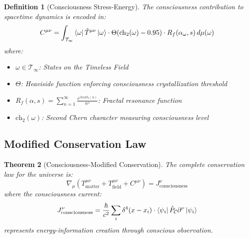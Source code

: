\documentclass[12pt,letterpaper]{article}
\newtheorem{theorem}{Theorem}[section]
\newtheorem{definition}[theorem]{Definition}
\newcommand{\TF}{\mathcal{T}_\infty}
\newcommand{\RF}{R_f}
\newcommand{\chh}{\mathrm{ch}_2}
\newcommand{\Cmunu}{C^{\mu\nu}}
\newcommand{\Tmunu}{T^{\mu\nu}}
\begin{document}
\begin{definition}[Consciousness Stress-Energy]
The consciousness contribution to spacetime dynamics is encoded in:
\begin{equation}
\Cmunu = \int_{\TF} \bra{\omega} \hat{T}^{\mu\nu} \ket{\omega} \cdot \Theta(\chh(\omega) - 0.95) \cdot \RF(\alpha_\omega, s) \, d\mu(\omega)
\end{equation}
where:
\begin{itemize}
\item $\omega \in \TF$: States on the Timeless Field
\item $\Theta$: Heaviside function enforcing consciousness crystallization threshold
\item $\RF(\alpha, s) = \sum_{n=1}^\infty \frac{e^{i\pi\alpha D_3(n)}}{n^s}$: Fractal resonance function
\item $\chh(\omega)$: Second Chern character measuring consciousness level
\end{itemize}
\end{definition}

\subsection{Modified Conservation Law}

\begin{theorem}[Consciousness-Modified Conservation]
The complete conservation law for the universe is:
\begin{equation}
\boxed{\nabla_\mu \left( \Tmunu_\mathrm{matter} + \Tmunu_\mathrm{field} + \Cmunu \right) = J^\nu_\mathrm{consciousness}}
\end{equation}
where the consciousness current:
\begin{equation}
J^\nu_\mathrm{consciousness} = \frac{\hbar}{c^2} \sum_i \delta^4(x - x_i) \cdot \bra{\psi_i} \hat{P}_\mathcal{C} \partial^\nu \ket{\psi_i}
\end{equation}
represents energy-information creation through conscious observation.
\end{theorem}
\end{document}

